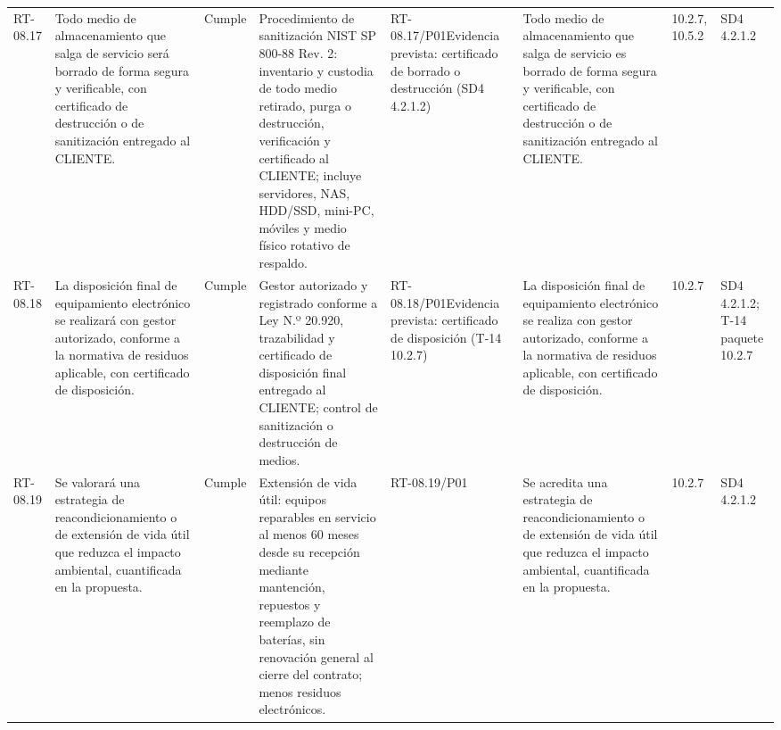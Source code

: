 \documentclass[oficio,firma,final]{lafrox}
\begin{document}
\begin{landscape}
{\begin{longtable}{@{}F{0.054} F{0.173} F{0.061} F{0.191} F{0.106} F{0.180} F{0.067} F{0.168}@{}}
  RT-08.17 & Todo medio de almacenamiento que salga de servicio será borrado de forma segura y verificable, con certificado de destrucción o de sanitización entregado al CLIENTE. & Cumple & Procedimiento de sanitización NIST SP 800-88 Rev. 2: inventario y custodia de todo medio retirado, purga o destrucción, verificación y certificado al CLIENTE; incluye servidores, NAS, HDD/SSD, mini-PC, móviles y medio físico rotativo de respaldo. & RT-08.17/\allowbreak{}P01\newline Evidencia prevista: certificado de borrado o destrucción (SD4 4.2.1.2) & Todo medio de almacenamiento que salga de servicio es borrado de forma segura y verificable, con certificado de destrucción o de sanitización entregado al CLIENTE. & 10.2.7, 10.5.2 & SD4 4.2.1.2  \\
  RT-08.18 & La disposición final de equipamiento electrónico se realizará con gestor autorizado, conforme a la normativa de residuos aplicable, con certificado de disposición. & Cumple & Gestor autorizado y registrado conforme a Ley N.º 20.920, trazabilidad y certificado de disposición final entregado al CLIENTE; control de sanitización o destrucción de medios. & RT-08.18/\allowbreak{}P01\newline Evidencia prevista: certificado de disposición (T-14 10.2.7) & La disposición final de equipamiento electrónico se realiza con gestor autorizado, conforme a la normativa de residuos aplicable, con certificado de disposición. & 10.2.7 & SD4 4.2.1.2; T-14 paquete 10.2.7  \\
  RT-08.19 & Se valorará una estrategia de reacondicionamiento o de extensión de vida útil que reduzca el impacto ambiental, cuantificada en la propuesta. & Cumple & Extensión de vida útil: equipos reparables en servicio al menos 60 meses desde su recepción mediante mantención, repuestos y reemplazo de baterías, sin renovación general al cierre del contrato; menos residuos electrónicos. & RT-08.19/\allowbreak{}P01 & Se acredita una estrategia de reacondicionamiento o de extensión de vida útil que reduzca el impacto ambiental, cuantificada en la propuesta. & 10.2.7 & SD4 4.2.1.2  \\

\end{longtable}}
\end{landscape}
\end{document}
